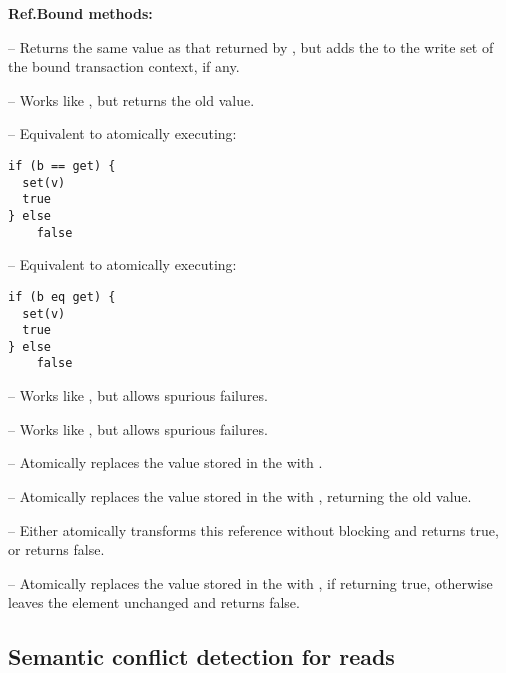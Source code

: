 \textbf{Ref.Bound methods:}
\begin{packed_itemize}
\item {} -- Returns the same value as that returned by , but
adds the  to the write set of the bound transaction context, if any.
\item {} -- Works like , but returns the old value. 
\item {} -- Equivalent to atomically executing:
\lstset{numbers=none}
\begin{lstlisting}
if (b == get) { 
  set(v) 
  true 
} else 
    false
\end{lstlisting}
\item {} -- Equivalent 
to atomically executing: 
\lstset{numbers=none}
\begin{lstlisting}
if (b eq get) { 
  set(v) 
  true 
} else 
    false
\end{lstlisting}
\item {} -- Works like 
, but allows spurious failures.
\item {} -- Works like 
, but allows spurious failures.
\item {} -- Atomically replaces the value  stored in the 
with .
\item {} -- Atomically replaces the value  stored in the 
with , returning the old value.
\item {} -- Either atomically transforms this reference without 
blocking and returns true, or returns false.
\item {} -- Atomically replaces 
the value  stored in the  with ,
if  returning true, otherwise leaves the element unchanged and returns false.
\end{packed_itemize}

\subsection{Semantic conflict detection for reads}
\label{sec:map}


